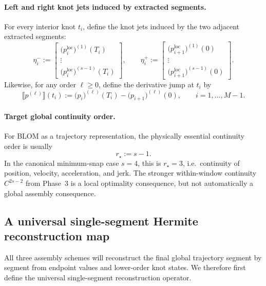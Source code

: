 \paragraph{Left and right knot jets induced by extracted segments.}
For every interior knot \(t_i\), define the knot jets induced by the two adjacent extracted segments:
\begin{equation}
\label{eq:phase5_eta_minus_plus}
\eta_i^{-}
:=
\begin{bmatrix}
\bigl(p_i^{\mathrm{loc}}\bigr)^{(1)}(T_i)\\
\vdots\\
\bigl(p_i^{\mathrm{loc}}\bigr)^{(s-1)}(T_i)
\end{bmatrix},
\qquad
\eta_i^{+}
:=
\begin{bmatrix}
\bigl(p_{i+1}^{\mathrm{loc}}\bigr)^{(1)}(0)\\
\vdots\\
\bigl(p_{i+1}^{\mathrm{loc}}\bigr)^{(s-1)}(0)
\end{bmatrix}.
\end{equation}
Likewise, for any order \(\ell\ge 0\), define the derivative jump at \(t_i\) by
\begin{equation}
\label{eq:phase5_jump_def}
\llbracket p^{(\ell)}\rrbracket(t_i)
:=
\bigl(p_i\bigr)^{(\ell)}(T_i)-\bigl(p_{i+1}\bigr)^{(\ell)}(0),
\qquad i=1,\dots,M-1.
\end{equation}

\paragraph{Target global continuity order.}
For BLOM as a trajectory representation, the physically essential continuity order is usually
\begin{equation}
\label{eq:phase5_target_r}
r_\star:=s-1.
\end{equation}
In the canonical minimum-snap case \(s=4\), this is \(r_\star=3\), i.e.\ continuity of position, velocity, acceleration, and jerk.
The stronger within-window continuity \(C^{2s-2}\) from Phase~3 is a local optimality consequence, but not automatically a global assembly consequence.

\subsection{A universal single-segment Hermite reconstruction map}
\label{subsec:phase5_single_segment_hermite}

All three assembly schemes will reconstruct the final global trajectory segment by segment from endpoint values and lower-order knot states.
We therefore first define the universal single-segment reconstruction operator.


